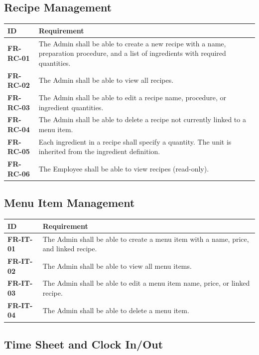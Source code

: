 \documentclass[12pt]{article}
\newcommand{\headerrow}{\rowcolor{darkblue}\color{white}\bfseries}
\begin{document}
\newpage

\subsection{Recipe Management}

\begin{longtable}{>{\bfseries}p{2cm} p{11cm}}
\toprule
\headerrow ID & Requirement \\
\midrule
\endhead
\rowcolor{lightgray} FR-RC-01 & The Admin shall be able to create a new recipe with a name, preparation procedure, and a list of ingredients with required quantities. \\
FR-RC-02 & The Admin shall be able to view all recipes. \\
\rowcolor{lightgray} FR-RC-03 & The Admin shall be able to edit a recipe name, procedure, or ingredient quantities. \\
FR-RC-04 & The Admin shall be able to delete a recipe not currently linked to a menu item. \\
\rowcolor{lightgray} FR-RC-05 & Each ingredient in a recipe shall specify a quantity. The unit is inherited from the ingredient definition. \\
FR-RC-06 & The Employee shall be able to view recipes (read-only). \\
\bottomrule
\end{longtable}

\subsection{Menu Item Management}

\begin{longtable}{>{\bfseries}p{2cm} p{11cm}}
\toprule
\headerrow ID & Requirement \\
\midrule
\endhead
\rowcolor{lightgray} FR-IT-01 & The Admin shall be able to create a menu item with a name, price, and linked recipe. \\
FR-IT-02 & The Admin shall be able to view all menu items. \\
\rowcolor{lightgray} FR-IT-03 & The Admin shall be able to edit a menu item name, price, or linked recipe. \\
FR-IT-04 & The Admin shall be able to delete a menu item. \\
\bottomrule
\end{longtable}

\subsection{Time Sheet and Clock In/Out}
\end{document}
